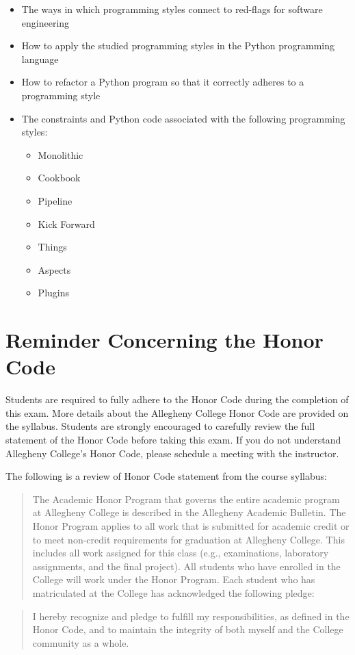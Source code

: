 \documentclass[11pt]{article}
\begin{document}
\begin{itemize}
\begin{itemize}
      \item The ways in which programming styles connect to red-flags for
        software engineering

      \item How to apply the studied programming styles in the Python
        programming language

      \item How to refactor a Python program so that it correctly adheres to a
        programming style

      \item The constraints and Python code associated with the following
        programming styles:

        \begin{itemize}
          \itemsep 0.025in
          \item Monolithic
          \item Cookbook
          \item Pipeline
          \item Kick Forward
          \item Things
          \item Aspects
          \item Plugins
        \end{itemize}

    \end{itemize}

\end{itemize}

\section*{Reminder Concerning the Honor Code}

\vspace*{-.025in}

\noindent Students are required to fully adhere to the Honor Code during the
completion of this exam. More details about the Allegheny College Honor Code are
provided on the syllabus. Students are strongly encouraged to carefully review
the full statement of the Honor Code before taking this exam. If you do not
understand Allegheny College's Honor Code, please schedule a meeting with the
instructor.

The following is a review of Honor Code statement from the course
syllabus:

\begin{quote}
  The Academic Honor Program that governs the entire academic program at
  Allegheny College is described in the Allegheny Academic Bulletin. The Honor
  Program applies to all work that is submitted for academic credit or to meet
  non-credit requirements for graduation at Allegheny College. This includes all
  work assigned for this class (e.g., examinations, laboratory assignments, and
  the final project). All students who have enrolled in the College will work
  under the Honor Program. Each student who has matriculated at the College has
  acknowledged the following pledge:
\end{quote}

\begin{quote}
  I hereby recognize and pledge to fulfill my responsibilities, as defined in
  the Honor Code, and to maintain the integrity of both myself and the College
  community as a whole.
\end{quote}
\end{document}
